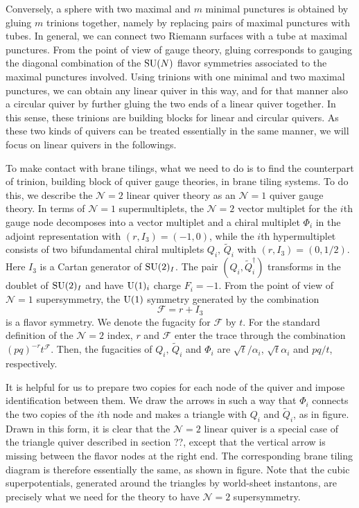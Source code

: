 Conversely, a sphere with two maximal and $m$ minimal punctures is
obtained by gluing $m$ trinions together, namely by replacing pairs
of maximal punctures with tubes. In general, we can connect two Riemann
surfaces with a tube at maximal punctures. From the point of view
of gauge theory, gluing corresponds to gauging the diagonal combination
of the $\mathrm{SU}(N)$ flavor symmetries associated to the maximal punctures
involved. Using trinions with one minimal and two maximal punctures,
we can obtain any linear quiver in this way, and for that manner also
a circular quiver by further gluing the two ends of a linear quiver
together. In this sense, these trinions are building blocks for linear
and circular quivers. As these two kinds of quivers can be treated
essentially in the same manner, we will focus on linear quivers in
the followings.

To make contact with brane tilings, what we need to do is to find
the counterpart of trinion, building block of quiver gauge theories,
in brane tiling systems. To do this, we describe the $\mathcal{N}=2$
linear quiver theory as an $\mathcal{N}=1$ quiver gauge theory. In
terms of $\mathcal{N}=1$ supermultiplets, the $\mathcal{N}=2$ vector
multiplet for the $i$th gauge node decomposes into a vector multiplet
and a chiral multiplet $\Phi_{i}$ in the adjoint representation with
$\left(r,I_{3}\right)=\left(-1,0\right)$, while the $i$th hypermultiplet
consists of two bifundamental chiral multiplets $Q_{i},\,\tilde{Q}_{i}$
with $\left(r,I_{3}\right)=\left(0,1/2\right)$. Here $I_{3}$ is
a Cartan generator of $\mathrm{SU}(2)_{I}$. The pair $(Q_{i},\tilde{Q}_{i}^{\dagger})$
transforms in the doublet of $\mathrm{SU}(2)_{I}$ and have $\mathrm{U}(1)_{i}$ charge
$F_{i}=-1$. From the point of view of $\mathcal{N}=1$ supersymmetry,
the $\mathrm{U}(1)$ symmetry generated by the combination 
\begin{equation}
    \mathcal{F}  =  r + I_{3}
\end{equation}
is a flavor symmetry. We denote the fugacity for $\mathcal{F}$ by
$t$. For the standard definition of the $\mathcal{N}=2$ index, $r$
and $\mathcal{F}$ enter the trace through the combination $(pq)^{-r}t^{\mathcal{F}}$.
Then, the fugacities of $Q_{i},\,\tilde{Q}_{i}$ and $\Phi_{i}$ are
$\sqrt{t}/\alpha_{i}$, $\sqrt{t}\alpha_{i}$ and $pq/t$, respectively. 

It is helpful for us to prepare two copies for each node of the quiver
and impose identification between them. We draw the arrows in such
a way that $\Phi_{i}$ connects the two copies of the $i$th node
and makes a triangle with $Q_{i}$ and $\tilde{Q}_{i}$, as in figure.
Drawn in this form, it is clear that the $\mathcal{N}=2$ linear quiver
is a special case of the triangle quiver described in section ??,
except that the vertical arrow is missing between the flavor nodes
at the right end. The corresponding brane tiling diagram is therefore
essentially the same, as shown in figure. Note that the cubic superpotentials,
generated around the triangles by world-sheet instantons, are precisely
what we need for the theory to have $\mathcal{N}=2$ supersymmetry.

